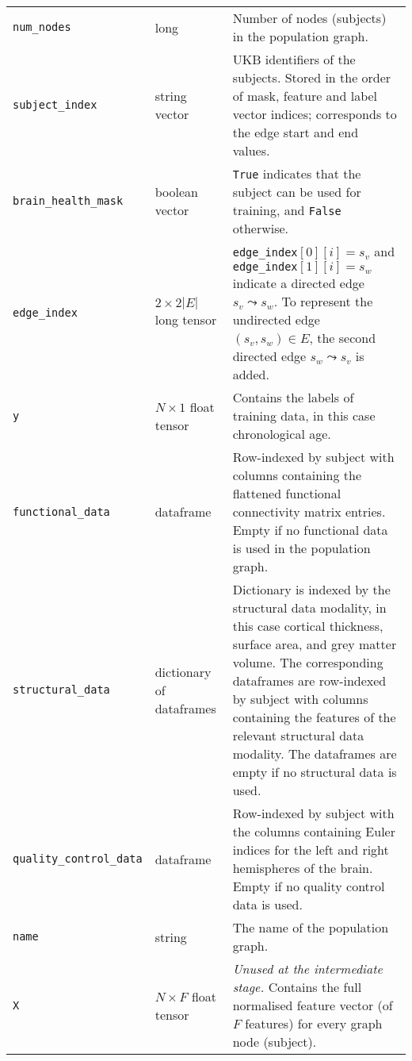 \begin{center}
\begin{longtable}[]{lp{}p{}}
    \texttt{num\_nodes} & long & Number of nodes (subjects) in the population graph. \\
    \texttt{subject\_index} & string vector & UKB identifiers of the subjects. Stored in the order of mask, feature and label vector indices; corresponds to the edge start and end values. \\
    \texttt{brain\_health\_mask} & boolean vector & \texttt{True} indicates that the subject can be used for training, and \texttt{False} otherwise. \\
    \texttt{edge\_index} & $2\times 2|E|$ \hfill\newline long tensor & \texttt{edge\_index}$[0][i]=s_v$ and \hfill \newline \texttt{edge\_index}$[1][i]=s_w$ indicate a directed \hfill \newline edge $s_v \leadsto s_w$. To represent the undirected edge $(s_v, s_w) \in E$, the second directed edge $s_w \leadsto s_v$ is added. \\
    \texttt{y} & $N \times 1$ \hfill \newline float tensor & Contains the labels of training data, in this case chronological age. \\
    \texttt{functional\_data} & dataframe & Row-indexed by subject with columns containing the flattened functional connectivity matrix entries. Empty if no functional data is used in the population graph. \\
    \texttt{structural\_data} & dictionary of \hfill \newline dataframes & Dictionary is indexed by the structural data modality, in this case cortical thickness, surface area, and grey matter volume. The corresponding dataframes are row-indexed by subject with columns containing the features of the relevant structural data modality. The dataframes are empty if no structural data is used. \\
    \texttt{quality\_control\_data} & dataframe & Row-indexed by subject with the columns containing Euler indices for the left and right hemispheres of the brain. Empty if no quality control data is used. \\
    \texttt{name} & string & The name of the population graph. \\
    \texttt{X} & $N \times F$ \hfill\newline float tensor & \textit{Unused at the intermediate stage.} Contains the full normalised feature vector (of $F$ features) for every graph node (subject). \\

\end{longtable}
\end{center}
